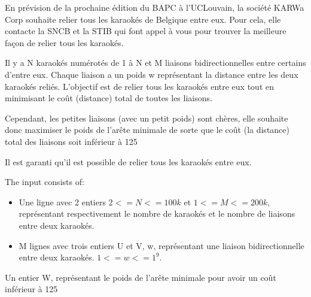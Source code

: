 \problemname{\problemyamlname}


En prévision de la prochaine édition du BAPC à l'UCLouvain, la société KARWa Corp souhaite relier tous les karaokés de Belgique entre eux. Pour cela, elle contacte la SNCB et la STIB qui font appel à vous pour trouver la meilleure façon de relier tous les karaokés.

Il y a N karaokés numérotés de 1 à N et M liaisons bidirectionnelles entre certains d'entre eux. Chaque liaison a un poids w représentant la distance entre les deux karaokés reliés. L'objectif est de relier tous les karaokés entre eux tout en minimisant le coût (distance) total de toutes les liaisons.

Cependant, les petites liaisons (avec un petit poids) sont chères, elle souhaite donc maximiser le poids de l'arête minimale de sorte que le coût (la distance) total des liaisons soit inférieur à 125%

Il est garanti qu'il est possible de relier tous les karaokés entre eux.


\begin{Input}
    The input consists of:
    \begin{itemize}
        \item Une ligne avec 2 entiers $2 <= N <= 100k$ et $1 <= M <= 200k$, représentant respectivement le nombre de karaokés et le nombre de liaisons entre deux karaokés.
        \item M lignes avec trois entiers U et V, w, représentant une liaison bidirectionnelle entre deux karaokés. $1 <= w <= 1^9$.
    \end{itemize}
\end{Input}

\begin{Output}
    Un entier W, représentant le poids de l'arête minimale pour avoir un coût inférieur à 125%
\end{Output}
